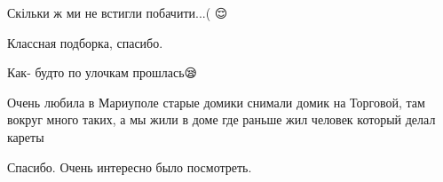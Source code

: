  
 
 
 
 

\qqSecCmt


Скільки ж ми не встигли побачити...( 😌


Классная подборка, спасибо.


Как- будто по улочкам прошлась😪


Очень любила в Мариуполе старые домики снимали домик на Торговой, там вокруг
много таких, а мы жили в доме где раньше жил человек который делал кареты


Спасибо. Очень интересно было посмотреть.
